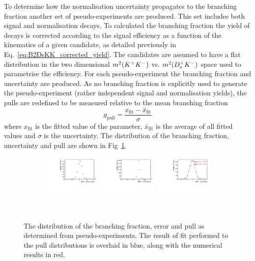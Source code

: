 To determine how the normalisation uncertainty propagates to the branching fraction another set of pseudo-experiments are produced.
This set includes both signal and normalisation decays. To calculated the branching fraction the yield of \decay{\Bp}{\Dsp\Kp\Km} decays is corrected according to the signal efficiency as a function of the kinematics of a given candidate, as detailed previously in Eq.~\ref{eq:B2DsKK_corrected_yield}. The candidates are assumed to have a flat distribution in the two dimensional $m^{2}({{K}^+}{{K}^-})$ vs. $m^{2}({{D}^+_{s}}{{K}^-})$ space used to parametrise the efficiency. For each pseudo-experiment the branching fraction and uncertainty are produced. As no branching fraction is explicitly used to generate the pseudo-experiment (rather independent signal and normalisation yields), the pulls are redefined to be measured relative to the mean branching fraction
\begin{equation}
g_{\text{pull}} = \frac{x_{\text{fit}} - \bar{x}_{\text{fit}} }{\sigma}
\end{equation}
where $x_{\text{fit}}$ is the fitted value of the parameter, $\bar{x}_{\text{fit}}$ is the average of all fitted values and $\sigma$ is the uncertainty. The distribution of the branching fraction, uncertainty and pull are shown in Fig~\ref{fig:B2DsKK_BR_Pulls}. 


\begin{figure}[!h]
   \centering
   \begin{subfigure}[t]{1.0\textwidth}
      \includegraphics[width=0.32\textwidth]{figs/B2DsKK/Branching_Fraction_val.pdf}
      \includegraphics[width=0.32\textwidth]{figs/B2DsKK/Branching_Fraction_err.pdf}
      \includegraphics[width=0.32\textwidth]{figs/B2DsKK/Branching_Fraction_pul.pdf}
   \end{subfigure}\\
   \caption{The distribution of the branching fraction, error and pull as determined from pseudo-experiments. The result of fit performed to the pull distributions is overlaid in blue, along with the numerical results in red.}
   \label{fig:B2DsKK_BR_Pulls}
\end{figure}

